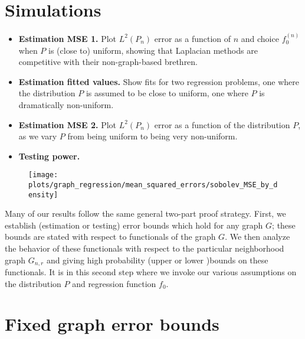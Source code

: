 \documentclass{article}
\newcommand{\1}{\mathbf{1}}
\theoremstyle{alden}
\theoremstyle{aldenthm}
\theoremstyle{definition}
\theoremstyle{remark}
\begin{document}
\section{Simulations}
\begin{itemize}
	\item \textbf{Estimation MSE 1.} Plot $L^2(P_n)$ error as a function of $n$ and choice $f_0^{(n)}$ when $P$ is (close to) uniform, showing that Laplacian methods are competitive with their non-graph-based brethren.
	\item \textbf{Estimation fitted values.} Show fits for two regression problems, one where the distribution $P$ is assumed to be close to uniform, one where $P$ is dramatically non-uniform.
	\item \textbf{Estimation MSE 2.} Plot $L^2(P_n)$ error as a function of the distribution $P$, as we vary $P$ from being uniform to being very non-uniform.
	 
	\item \textbf{Testing power.} 
\end{itemize}

\begin{figure}
	\centering
	\texttt{[image: plots/graph\_regression/mean\_squared\_errors/sobolev\_MSE\_by\_density]}
	\caption{}
	\label{fig:piecewise_cosine}
\end{figure}

\clearpage

\appendix

Many of our results follow the same general two-part proof strategy. First, we establish (estimation or testing) error bounds which hold for any graph $G$; these bounds are stated with respect to functionals of the graph $G$. We then analyze the behavior of these functionals with respect to the particular neighborhood graph $G_{n,r}$ and giving high probability (upper or lower )bounds on these functionals. It is in this second step where we invoke our various assumptions on the distribution $P$ and regression function $f_0$.

\section{Fixed graph error bounds}
\label{sec:fixed_graph_error_bounds}
\end{document}
